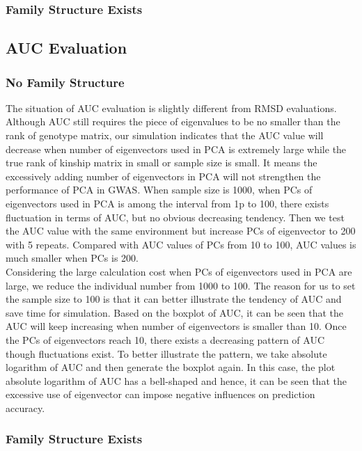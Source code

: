 \documentclass[12pt]{article}
\theoremstyle{definition}
\theoremstyle{plain}
\begin{document}
\subsubsection{Family Structure Exists}


\subsection{AUC Evaluation}
\subsubsection{No Family Structure}
The situation of AUC evaluation is slightly different from RMSD evaluations. Although AUC still requires the piece of eigenvalues to be no smaller than the rank of genotype matrix, our simulation indicates that the AUC value will decrease when number of eigenvectors used in PCA is extremely large while the true rank of kinship matrix in small or sample size is small. It means the excessively adding number of eigenvectors in PCA will not strengthen the performance of PCA in GWAS.
When sample size is 1000, when PCs of eigenvectors used in PCA is among the interval from 1p to 100, there exists fluctuation in terms of AUC, but no obvious decreasing tendency. Then we test the AUC value with the same environment but increase PCs of eigenvector to 200 with 5 repeats. Compared with AUC values of PCs from 10 to 100, AUC values is much smaller when PCs is 200.\\
 Considering the large calculation cost when PCs of eigenvectors used in PCA are large, we reduce the individual number from 1000 to 100. The reason for us to set the sample size to 100 is that it can better illustrate the tendency of AUC and save time for simulation. Based on the boxplot of AUC, it can be seen that the AUC will keep increasing when number of eigenvectors is smaller than 10. Once the PCs of eigenvectors reach 10, there exists a decreasing pattern of AUC though fluctuations exist. To better illustrate the pattern, we take absolute logarithm of AUC and then generate the boxplot again. In this case, the plot absolute logarithm of AUC has a bell-shaped and hence, it can be seen that the excessive use of eigenvector can impose negative influences on prediction accuracy.\\
 \subsubsection{Family Structure Exists}
\end{document}
